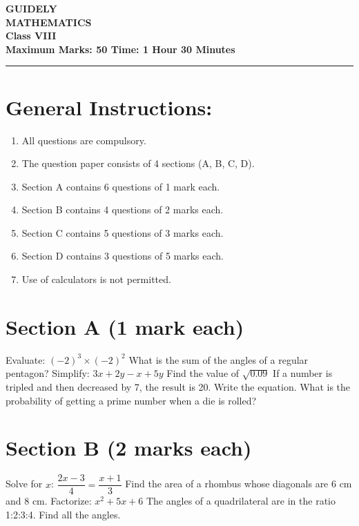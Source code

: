 \documentclass[11pt,a4paper]{exam}
\newcommand{\SCHOOLNAME}{GUIDELY}
\begin{document}
	
	\begin{center}
		\Large\textbf{\SCHOOLNAME} \\
		\large\textbf{MATHEMATICS} \\
		\textbf{Class VIII} \\
		\textbf{Maximum Marks: 50 \hspace{2cm} Time: 1 Hour 30 Minutes} \\
		\rule{\textwidth}{1pt}
	\end{center}
	
	\section*{General Instructions:}
	\begin{enumerate}
		\item All questions are compulsory.
		\item The question paper consists of 4 sections (A, B, C, D).
		\item Section A contains 6 questions of 1 mark each.
		\item Section B contains 4 questions of 2 marks each.
		\item Section C contains 5 questions of 3 marks each.
		\item Section D contains 3 questions of 5 marks each.
		\item Use of calculators is not permitted.
	\end{enumerate}
	
	\section*{Section A (1 mark each)}
	\begin{questions}
		\question Evaluate: $(-2)^3 \times (-2)^2$
		\question What is the sum of the angles of a regular pentagon?
		\question Simplify: $3x + 2y - x + 5y$
		\question Find the value of $\sqrt{0.09}$
		\question If a number is tripled and then decreased by 7, the result is 20. Write the equation.
		\question What is the probability of getting a prime number when a die is rolled?
	\end{questions}
	
	\section*{Section B (2 marks each)}
	\begin{questions}
		\question Solve for $x$: $\dfrac{2x-3}{4} = \dfrac{x+1}{3}$
		\question Find the area of a rhombus whose diagonals are 6 cm and 8 cm.
		\question Factorize: $x^2 + 5x + 6$
		\question The angles of a quadrilateral are in the ratio 1:2:3:4. Find all the angles.
	\end{questions}
	
\end{document}
